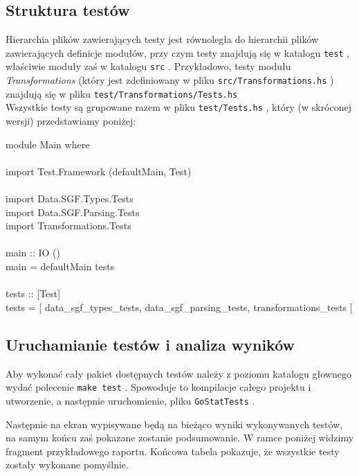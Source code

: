 \documentclass[10pt,leqno]{article}
\newcommand{\cmd}[1]{
  \texttt{#1}
}
\begin{document}
\subsection{Struktura testów}

Hierarchia plików zawierających testy jest równoległa do hierarchii plików zawierających definicje 
modułów, przy czym testy znajdują się w katalogu \cmd{test}, właściwie moduły zaś w katalogu \cmd{src}.
Przykładowo, testy modułu \emph{Transformations} (który jest zdefiniowany w pliku \cmd{src/Transformations.hs})
znajdują się w pliku \cmd{test/Transformations/Tests.hs} \\

\noindent Wszystkie testy są grupowane razem w pliku \cmd{test/Tests.hs}, który (w skróconej wersji) przedstawiamy poniżej:

\begin{framed}
\noindent module Main where \\
\\
import Test.Framework (defaultMain, Test) \\
\\
import Data.SGF.Types.Tests \\
import Data.SGF.Parsing.Tests \\ 
import Transformations.Tests \\
\\ 
main :: IO () \\
main = defaultMain tests \\
\\ 
tests :: [Test] \\
tests = [ data\_sgf\_types\_tests, data\_sgf\_parsing\_tests, transformations\_tests ]
\end{framed}

\subsection{Uruchamianie testów i analiza wyników}

Aby wykonać cały pakiet dostępnych testów należy z poziomu katalogu głownego wydać polecenie \cmd{make test}.
Spowoduje to kompilacje całego projektu i utworzenie, a następnie uruchomienie, pliku \cmd{GoStatTests}.

Następnie na ekran wypisywane będą na bieżąco wyniki wykonywanych testów, na samym końcu zaś pokazane zostanie
podsumowanie. W ramce poniżej widzimy fragment przykładowego raportu. Końcowa tabela pokazuje, że wszystkie
testy zostały wykonane pomyślnie.
\end{document}

